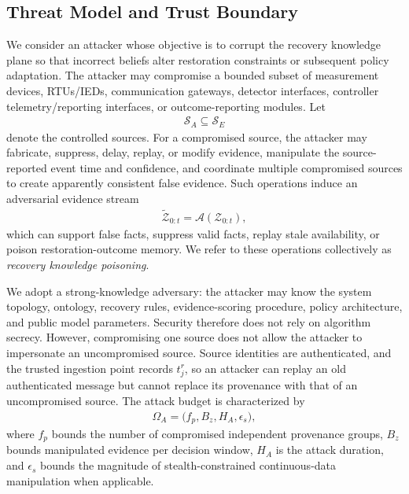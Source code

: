 \subsection{Threat Model and Trust Boundary}
\label{subsec-threat-model}
We consider an attacker whose objective is to corrupt the recovery knowledge plane so that incorrect beliefs alter restoration constraints or subsequent policy adaptation. The attacker may compromise a bounded subset of measurement devices, RTUs/IEDs, communication gateways, detector interfaces, controller telemetry/reporting interfaces, or outcome-reporting modules. Let
\begin{align}
\label{eq-attacker-sources}
\mathcal{S}_{A}\subseteq\mathcal{S}_{E}
\end{align}
denote the controlled sources. For a compromised source, the attacker may fabricate, suppress, delay, replay, or modify evidence, manipulate the source-reported event time and confidence, and coordinate multiple compromised sources to create apparently consistent false evidence. Such operations induce an adversarial evidence stream
\begin{align}
\label{eq-poisoned-evidence}
\widetilde{\mathcal{Z}}_{0:t}=\mathscr{A}(\mathcal{Z}_{0:t}),
\end{align}
which can support false facts, suppress valid facts, replay stale availability, or poison restoration-outcome memory. We refer to these operations collectively as \emph{recovery knowledge poisoning}.

We adopt a strong-knowledge adversary: the attacker may know the system topology, ontology, recovery rules, evidence-scoring procedure, policy architecture, and public model parameters. Security therefore does not rely on algorithm secrecy. However, compromising one source does not allow the attacker to impersonate an uncompromised source. Source identities are authenticated, and the trusted ingestion point records $t^{r}_j$, so an attacker can replay an old authenticated message but cannot replace its provenance with that of an uncompromised source. The attack budget is characterized by
\begin{align}
\label{eq-attack-budget}
\Omega_A=\big(f_{p},B_{z},H_{A},\epsilon_{s}\big),
\end{align}
where $f_p$ bounds the number of compromised independent provenance groups, $B_z$ bounds manipulated evidence per decision window, $H_A$ is the attack duration, and $\epsilon_s$ bounds the magnitude of stealth-constrained continuous-data manipulation when applicable.

